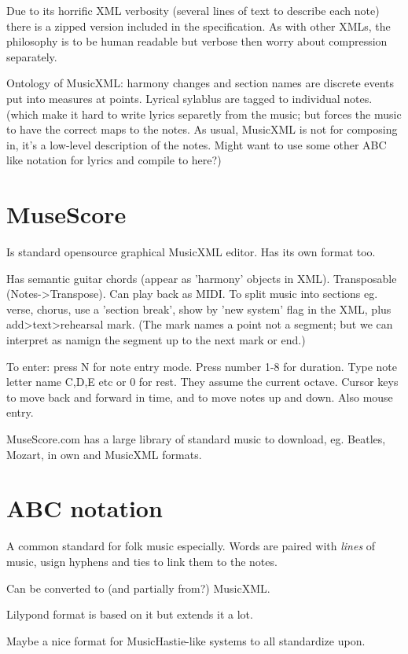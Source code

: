 \documentclass[oneside,english]{scrbook}
\begin{document}
Due to its horrific XML verbosity (several lines of text to describe each note) there is a zipped version included in the specification. As with other XMLs, the philosophy is to be human readable but verbose then worry about compression separately.


Ontology of MusicXML: harmony changes and section names are discrete events put into measures at points.  Lyrical sylablus are tagged to individual notes. (which make it hard to write lyrics separetly from the music; but forces the music to have the correct maps to the notes.  As usual, MusicXML is not for composing in, it's a low-level description of the notes. Might want to use some other ABC like notation for lyrics and compile to here?)

\section{MuseScore}
Is standard opensource graphical MusicXML editor. Has its own format too.   

Has semantic guitar chords (appear as 'harmony' objects in XML). Transposable (Notes->Transpose). Can play back as MIDI. To split music into sections eg. verse, chorus, use a 'section break', show by 'new system' flag in the XML, plus add>text>rehearsal mark. (The mark names a point not a segment; but we can interpret as namign the segment up to the next mark or end.)

To enter: press N for note entry mode. Press number 1-8 for duration. Type note letter name C,D,E etc or 0 for rest. They assume the current octave.  Cursor keys to move back and forward in time, and to move notes up and down. Also mouse entry.

MuseScore.com has a large library of standard music to download, eg. Beatles, Mozart, in own and MusicXML formats.

\section{ABC notation}

A common standard for folk music especially.   Words are paired with {\em lines} of music, usign hyphens and ties to link them to the notes.

Can be converted to (and partially from?) MusicXML.

Lilypond format is based on it but extends it a lot.

Maybe a nice format for MusicHastie-like systems to all standardize upon.
\end{document}
